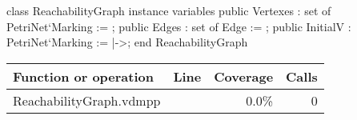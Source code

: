 \begin{vdmpp}
class ReachabilityGraph
instance variables
 public Vertexes : set of PetriNet`Marking := {};
 public Edges : set of Edge := {};
 public InitialV : PetriNet`Marking := {|->};
end ReachabilityGraph
\end{vdmpp}
\bigskip
\begin{longtable}{|l|r|r|r|}
\hline
Function or operation & Line & Coverage & Calls \\
\hline
\hline
\hline
ReachabilityGraph.vdmpp & & 0.0\% & 0 \\
\hline
\end{longtable}

